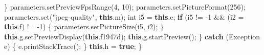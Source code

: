\documentclass[
]{article}
\newenvironment{Shaded}{}{}
\newcommand{\BuiltInTok}[1]{\textcolor[rgb]{0.00,0.50,0.00}{#1}}
\newcommand{\ControlFlowTok}[1]{\textcolor[rgb]{0.00,0.44,0.13}{\textbf{#1}}}
\newcommand{\DataTypeTok}[1]{\textcolor[rgb]{0.56,0.13,0.00}{#1}}
\newcommand{\DecValTok}[1]{\textcolor[rgb]{0.25,0.63,0.44}{#1}}
\newcommand{\FunctionTok}[1]{\textcolor[rgb]{0.02,0.16,0.49}{#1}}
\newcommand{\KeywordTok}[1]{\textcolor[rgb]{0.00,0.44,0.13}{\textbf{#1}}}
\newcommand{\NormalTok}[1]{#1}
\newcommand{\OperatorTok}[1]{\textcolor[rgb]{0.40,0.40,0.40}{#1}}
\newcommand{\StringTok}[1]{\textcolor[rgb]{0.25,0.44,0.63}{#1}}
\begin{document}
\begin{Shaded}
\begin{Highlighting}[]
            \OperatorTok{\}}
\NormalTok{            parameters}\OperatorTok{.}\FunctionTok{setPreviewFpsRange}\OperatorTok{(}\DecValTok{4}\OperatorTok{,} \DecValTok{10}\OperatorTok{);}
\NormalTok{            parameters}\OperatorTok{.}\FunctionTok{setPictureFormat}\OperatorTok{(}\DecValTok{256}\OperatorTok{);}
\NormalTok{            parameters}\OperatorTok{.}\FunctionTok{set}\OperatorTok{(}\StringTok{"jpeg{-}quality"}\OperatorTok{,} \KeywordTok{this}\OperatorTok{.}\FunctionTok{m}\OperatorTok{);}
            \DataTypeTok{int}\NormalTok{ i5 }\OperatorTok{=} \KeywordTok{this}\OperatorTok{.}\FunctionTok{e}\OperatorTok{;}
            \ControlFlowTok{if} \OperatorTok{(}\NormalTok{i5 }\OperatorTok{!=} \OperatorTok{{-}}\DecValTok{1} \OperatorTok{\&\&} \OperatorTok{(}\NormalTok{i2 }\OperatorTok{=} \KeywordTok{this}\OperatorTok{.}\FunctionTok{f}\OperatorTok{)} \OperatorTok{!=} \OperatorTok{{-}}\DecValTok{1}\OperatorTok{)} \OperatorTok{\{}
\NormalTok{                parameters}\OperatorTok{.}\FunctionTok{setPictureSize}\OperatorTok{(}\NormalTok{i5}\OperatorTok{,}\NormalTok{ i2}\OperatorTok{);}
            \OperatorTok{\}}
            \KeywordTok{this}\OperatorTok{.}\FunctionTok{g}\OperatorTok{.}\FunctionTok{setPreviewDisplay}\OperatorTok{(}\KeywordTok{this}\OperatorTok{.}\FunctionTok{f1947d}\OperatorTok{);}
            \KeywordTok{this}\OperatorTok{.}\FunctionTok{g}\OperatorTok{.}\FunctionTok{startPreview}\OperatorTok{();}
        \OperatorTok{\}} \ControlFlowTok{catch} \OperatorTok{(}\BuiltInTok{Exception}\NormalTok{ e}\OperatorTok{)} \OperatorTok{\{}
\NormalTok{            e}\OperatorTok{.}\FunctionTok{printStackTrace}\OperatorTok{();}
        \OperatorTok{\}}
        \KeywordTok{this}\OperatorTok{.}\FunctionTok{h} \OperatorTok{=} \KeywordTok{true}\OperatorTok{;}
    \OperatorTok{\}}


\end{Highlighting}
\end{Shaded}
\end{document}
